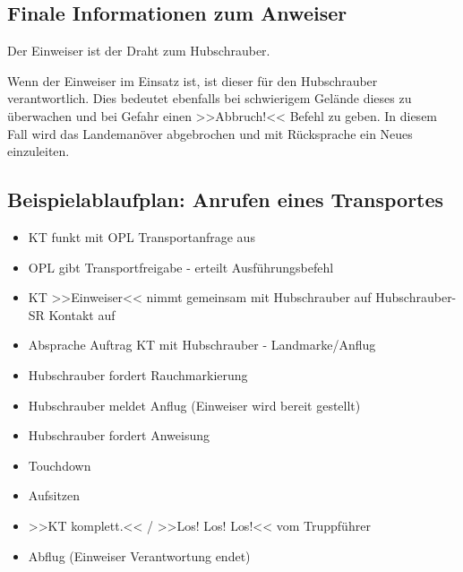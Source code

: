 \subsection{Finale Informationen zum Anweiser}
	Der Einweiser ist der Draht zum Hubschrauber.

	Wenn der Einweiser im Einsatz ist, ist dieser für den Hubschrauber verantwortlich. Dies bedeutet ebenfalls bei schwierigem Gelände dieses zu überwachen und bei Gefahr einen >>Abbruch!<< Befehl zu geben. In diesem Fall wird das Landemanöver abgebrochen und mit Rücksprache ein Neues einzuleiten.

\subsection{Beispielablaufplan: Anrufen eines Transportes}
	\begin{itemize}
		\item \ac{KT} funkt mit \ac{OPL} Transportanfrage aus
    	\item \ac{OPL} gibt Transportfreigabe - erteilt Ausführungsbefehl
		\item \ac{KT} >>Einweiser<< nimmt gemeinsam mit Hubschrauber auf Hubschrauber-\ac{SR} Kontakt auf
  		\item Absprache Auftrag \ac{KT} mit Hubschrauber - Landmarke/Anflug
		\item Hubschrauber fordert Rauchmarkierung
		\item Hubschrauber meldet Anflug (Einweiser wird bereit gestellt)
		\item Hubschrauber fordert Anweisung
		\item Touchdown
		\item Aufsitzen
		\item >>\acl{KT} komplett.<< / >>Los! Los! Los!<< vom Truppführer
		\item Abflug (Einweiser Verantwortung endet)
	\end{itemize}
